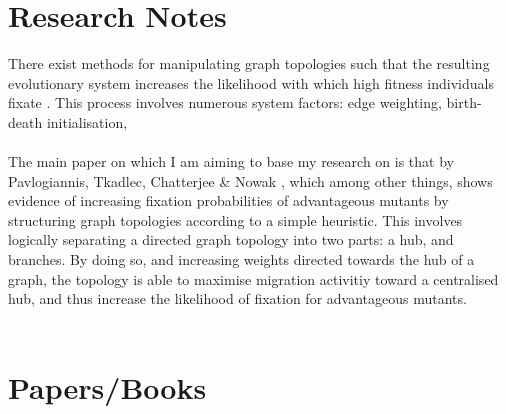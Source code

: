 \documentclass[10pt,a4paper]{article}
\begin{document}
\section{Research Notes}
There exist methods for manipulating graph topologies such that the resulting evolutionary system increases the likelihood with which high fitness individuals fixate \cite{graph amplifiers, birth-death amplifiers}.
This process involves numerous system factors: edge weighting, birth-death initialisation, 
\\\\
The main paper on which I am aiming to base my research on is that by Pavlogiannis, Tkadlec, Chatterjee \& Nowak \cite{graph amplifiers}, which among other things, shows evidence of increasing fixation probabilities of advantageous mutants by structuring graph topologies according to a simple heuristic.
This involves logically separating a directed graph topology into two parts: a hub, and branches.
By doing so, and increasing weights directed towards the hub of a graph, the topology is able to maximise migration activitiy toward a centralised hub, and thus increase the likelihood of fixation for advantageous mutants.
\\\\

\section{Papers/Books}
\end{document}
